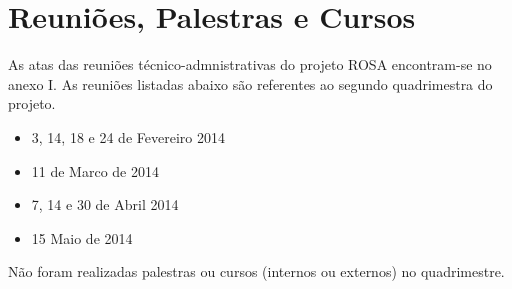 

\section{Reuniões, Palestras e Cursos}
\label{reunioes_palestras_e_cursos}

As atas das reuniões técnico-admnistrativas do projeto ROSA encontram-se no anexo I.
As reuniões listadas abaixo são referentes ao segundo quadrimestra do projeto.  
\begin{itemize} 
	\item 3, 14, 18 e 24 de Fevereiro 2014
	\item 11 de Marco de 2014
	\item 7, 14 e 30 de Abril 2014
	\item 15  Maio de 2014
\end{itemize} 

Não foram realizadas palestras ou cursos (internos ou externos) no quadrimestre.
